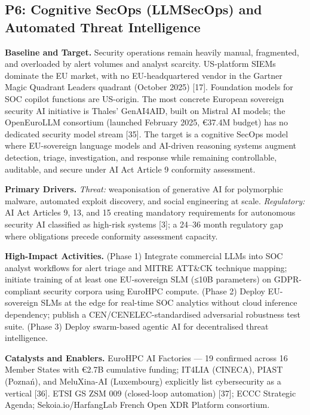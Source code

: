 \documentclass{ieeeaccess}
\begin{document}
\subsection{P6: Cognitive SecOps (LLMSecOps) and Automated Threat
Intelligence}\label{p6-cognitive-secops-llmsecops-and-automated-threat-intelligence}

\textbf{Baseline and Target.} Security operations remain heavily manual,
fragmented, and overloaded by alert volumes and analyst scarcity.
US-platform SIEMs dominate the EU market, with no EU-headquartered
vendor in the Gartner Magic Quadrant Leaders quadrant (October 2025)
{[}17{]}. Foundation models for SOC copilot functions are US-origin. The
most concrete European sovereign security AI initiative is Thales'
GenAI4AID, built on Mistral AI models; the OpenEuroLLM consortium
(launched February 2025, €37.4M budget) has no dedicated security model
stream {[}35{]}. The target is a cognitive SecOps model where
EU-sovereign language models and AI-driven reasoning systems augment
detection, triage, investigation, and response while remaining
controllable, auditable, and secure under AI Act Article 9 conformity
assessment.

\textbf{Primary Drivers.} \emph{Threat:} weaponisation of generative AI
for polymorphic malware, automated exploit discovery, and social
engineering at scale. \emph{Regulatory:} AI Act Articles 9, 13, and 15
creating mandatory requirements for autonomous security AI classified as
high-risk systems {[}3{]}; a 24--36 month regulatory gap where
obligations precede conformity assessment capacity.

\textbf{High-Impact Activities.} (Phase 1) Integrate commercial LLMs
into SOC analyst workflows for alert triage and MITRE ATT\&CK technique
mapping; initiate training of at least one EU-sovereign SLM (≤10B
parameters) on GDPR-compliant security corpora using EuroHPC compute.
(Phase 2) Deploy EU-sovereign SLMs at the edge for real-time SOC
analytics without cloud inference dependency; publish a
CEN/CENELEC-standardised adversarial robustness test suite. (Phase 3)
Deploy swarm-based agentic AI for decentralised threat intelligence.

\textbf{Catalysts and Enablers.} EuroHPC AI Factories --- 19 confirmed
across 16 Member States with €2.7B cumulative funding; IT4LIA (CINECA),
PIAST (Poznań), and MeluXina-AI (Luxembourg) explicitly list
cybersecurity as a vertical {[}36{]}. ETSI GS ZSM 009 (closed-loop
automation) {[}37{]}; ECCC Strategic Agenda; Sekoia.io/HarfangLab French
Open XDR Platform consortium.
\end{document}
